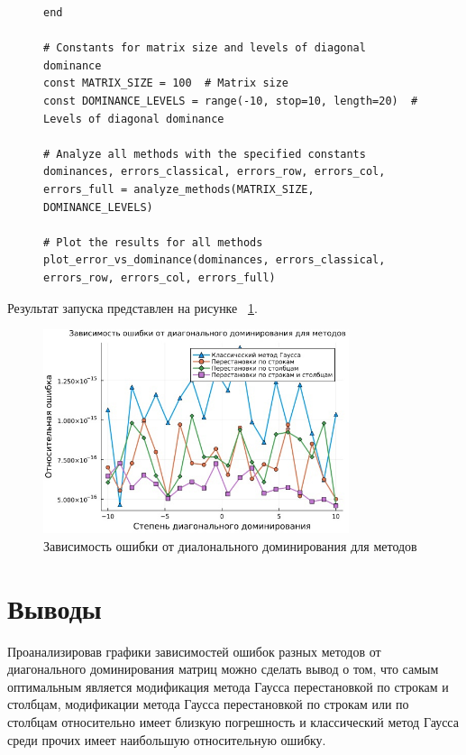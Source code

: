 \documentclass[a4paper, 14pt]{extarticle}
\begin{document}
\begin{figure}[!htb]
\begin{lstlisting}[caption={Реализация и сравнение разных вариаций метода Гаусса},label={lst:code5}]
end

# Constants for matrix size and levels of diagonal dominance
const MATRIX_SIZE = 100  # Matrix size
const DOMINANCE_LEVELS = range(-10, stop=10, length=20)  # Levels of diagonal dominance

# Analyze all methods with the specified constants
dominances, errors_classical, errors_row, errors_col, errors_full = analyze_methods(MATRIX_SIZE, DOMINANCE_LEVELS)

# Plot the results for all methods
plot_error_vs_dominance(dominances, errors_classical, errors_row, errors_col, errors_full)
\end{lstlisting}
\end{figure}

Результат запуска представлен на рисунке ~\ref{fig:img1}.

\begin{figure}[!htb]
	\centering
	\includegraphics[width=0.8\textwidth]{img1}
\caption{Зависимость ошибки от диалонального доминирования для методов}
\label{fig:img1}
\end{figure}

\section{Выводы}\label{Sect::conclusion}

Проанализировав графики зависимостей ошибок разных методов от диагонального доминирования матриц можно сделать вывод о том, что самым оптимальным является модификация метода Гаусса перестановкой по строкам и столбцам, модификации метода Гаусса перестановкой по строкам или по столбцам относительно имеет близкую погрешность и классический метод Гаусса среди прочих имеет наибольшую относительную ошибку.
\end{document}
